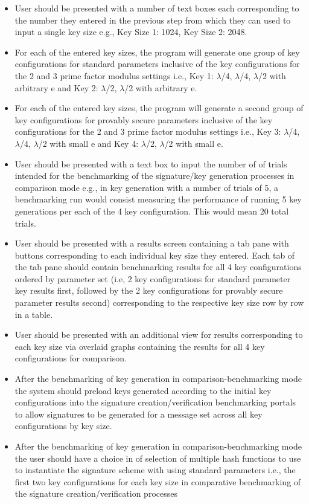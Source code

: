 \documentclass[]{final_report}
\theoremstyle{definition}
\begin{document}
\begin{enumerate}
\begin{itemize}
\item User should be presented with a number of text boxes each corresponding to the number they entered in the previous step from which they can used to input a single key size e.g., Key Size 1: 1024, Key Size 2: 2048.
\item For each of the entered key sizes, the program will generate one group of key configurations for standard parameters inclusive of the key configurations for the 2 and 3 prime factor modulus settings i.e., Key 1: $\lambda$/4, $\lambda$/4, $\lambda$/2 with arbitrary e
and Key 2: $\lambda$/2, $\lambda$/2 with arbitrary e.
\item For each of the entered key sizes, the program will generate a second group of key configurations for provably secure parameters inclusive of the key configurations for the 2 and 3 prime factor modulus settings i.e., Key 3: $\lambda$/4, $\lambda$/4, $\lambda$/2 with small e and Key 4: $\lambda$/2, $\lambda$/2 with small e.
\item User should be presented with a text box to input the number of of trials intended for the benchmarking of the signature/key generation processes in comparison mode  e.g., in key generation with a number of trials of 5, a benchmarking run would consist measuring the performance of running 5 key generations per each of the 4 key configuration. This would mean 20 total trials.
\item User should be presented with a results screen containing a tab pane with buttons corresponding to each individual key size they entered. Each tab of the tab pane should contain benchmarking results for all 4 key configurations ordered by parameter set (i.e, 2 key configurations for standard parameter key results first, followed by the 2 key configurations for provably secure parameter results second) corresponding to the respective key size row by row in a table.
\item User should be presented with an additional view for results corresponding to each key size via overlaid graphs containing the results for all 4 key configurations for comparison.
\item After the benchmarking of key generation in comparison-benchmarking mode the system should preload keys generated according to the initial key configurations into the signature creation/verification benchmarking portals to allow signatures to be generated for a message set across all key configurations by key size.
\item After the benchmarking of key generation in comparison-benchmarking mode the user should have a choice in of selection of multiple hash functions to use to instantiate the signature scheme with using standard parameters i.e., the first two key configurations for each key size in comparative benchmarking of the signature creation/verification processes

\end{itemize}
\end{enumerate}
\end{document}
